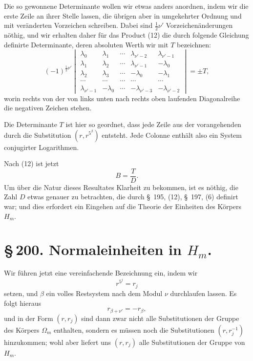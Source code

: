 \documentclass[11pt]{article}
\begin{document}
Die so gewonnene Determinante wollen wir etwas anders anordnen, indem wir die erste Zeile an ihrer Stelle lassen, die
übrigen aber in umgekehrter Ordnung und mit veränderten Vorzeichen schreiben. Dabei sind $\frac12\nu'$ Vorzeichenänderungen nöthig, und wir erhalten daher für das Product (12) die durch folgende Gleichung definirte Determinante, deren absoluten Werth wir mit $T$ bezeichnen:
\begin{equation}
(-1)^{\frac12\nu'}
\begin{vmatrix}
\lambda_0&\lambda_1&\cdots&\lambda_{\nu'-2}&\lambda_{\nu'-1}\\
\lambda_1&\lambda_2&\cdots&\lambda_{\nu'-1}&-\lambda_0\\
\lambda_2&\lambda_3&\cdots&-\lambda_0&-\lambda_1\\
\cdots&\cdots&\cdots&\cdots&\cdots\\
\lambda_{\nu'-1}&-\lambda_0&\cdots&-\lambda_{\nu'-3}&-\lambda_{\nu'-2}
\end{vmatrix}=\pm T,
\tag{14}
\end{equation}
worin rechts von der von links unten nach rechts oben laufenden Diagonalreihe die negativen Zeichen stehen.

Die Determinante $T$ ist hier so geordnet, dass jede Zeile aus der vorangehenden durch die Substitution $(r,r^{5^\beta})$ entsteht. Jede Colonne enthält also ein System conjugirter Logarithmen.

Nach (12) ist jetzt
\begin{equation}
B=\frac{T}{D}.
\tag{15}
\end{equation}
Um über die Natur dieses Resultates Klarheit zu bekommen, ist es nöthig, die Zahl $D$ etwas genauer zu betrachten, die durch \S~195, (12), \S~197, (6) definirt war; und dies erfordert ein Eingehen auf die Theorie der Einheiten des Körpers $H_m$.

\clearpage
\section*{\S\,200. Normaleinheiten in $H_m$.}

Wir führen jetzt eine vereinfachende Bezeichnung ein, indem wir
\begin{equation}
r^{5^j}=r_j
\tag{1}
\end{equation}
setzen, und $\beta$ ein volles Restsystem nach dem Modul $\nu$ durchlaufen lassen. Es folgt hieraus
\begin{equation}
r_{\beta+\nu'}=-r_\beta,
\tag{2}
\end{equation}
und in der Form $(r,r_j)$ sind dann zwar nicht alle Substitutionen der Gruppe des Körpers $\Omega_m$ enthalten, sondern es müssen noch die Substitutionen $(r,r_j^{-1})$ hinzukommen; wohl aber liefert uns $(r,r_j)$ alle Substitutionen der Gruppe von $H_m$.
\end{document}
